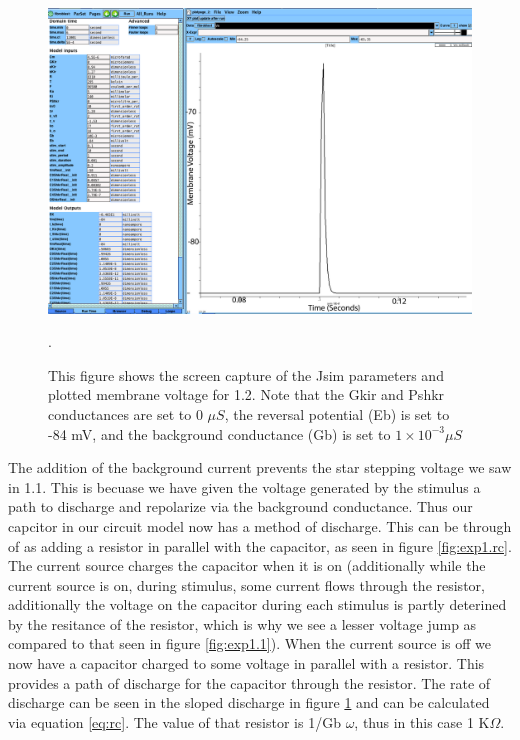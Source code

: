 \documentclass[11pt]{article}
\begin{document}
\begin{figure}[H]
	\centering
	\centering
	\includegraphics[width = .95\textwidth]{exp2.png}
	\caption{This figure shows the screen capture of the Jsim parameters and plotted membrane voltage for 1.2. Note that the Gkir and Pshkr conductances are set to 0 \ensuremath{\mu S}, the reversal potential (Eb) is set to -84 mV, and the background conductance (Gb) is set to \ensuremath{1\times{}10^{-3}\mu S}}.
	\label{fig:exp1.2}
\end{figure}

\par{}
The addition of the background current prevents the star stepping voltage we saw in 1.1. This is becuase we have given the voltage generated by the stimulus a path to discharge and repolarize via the background conductance. Thus our capcitor in our circuit model now has a method of discharge. This can be through of as adding a resistor in parallel with the capacitor, as seen in figure \ref{fig:exp1.rc}. The current source charges the capacitor when it is on (additionally while the current source is on, during stimulus, some current flows through the resistor, additionally the voltage on the capacitor during each stimulus is partly deterined by the resitance of the resistor, which is why we see a lesser voltage jump as compared to that seen in figure \ref{fig:exp1.1}). When the current source is off we now have a capacitor charged to some voltage in parallel with a resistor. This provides a path of discharge for the capacitor through the resistor. The rate of discharge can be seen in the sloped discharge in figure \ref{fig:exp1.2} and can be calculated via equation \ref{eq:rc}. The value of that resistor is 1/Gb $\omega$, thus in this case 1 K$\Omega$.
\end{document}
